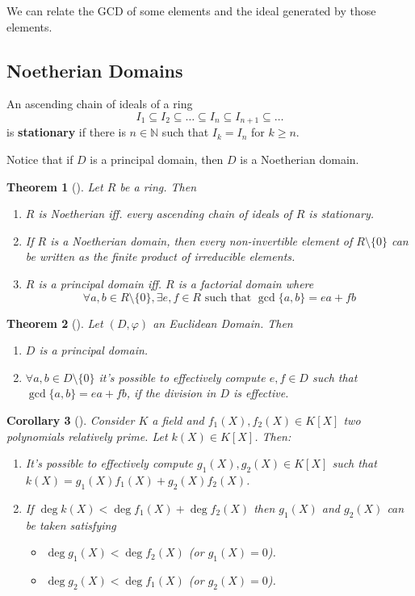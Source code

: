 \documentclass[12pt,a4paper]{article}
\newtheorem{theorem}{Theorem}[section]
\newtheorem{corollary}[theorem]{Corollary}
\theoremstyle{definition}
\begin{document}
We can relate the GCD of some elements and the ideal generated by those elements.

\subsection{Noetherian Domains}

An ascending chain of ideals of a ring
\[
I_1 \subseteq I_2 \subseteq \ldots \subseteq I_n \subseteq I_{n+1} \subseteq \ldots
\]
is \textbf{stationary} if there is $n \in \mathbb{N}$ such that $I_k = I_n$ for $k \geq n$.

Notice that if $D$ is a principal domain, then $D$ is a Noetherian domain.

\begin{theorem}[]
Let $R$ be a ring. Then
\begin{enumerate}
\item $R$ is Noetherian iff. every ascending chain of ideals of $R$ is stationary.
\item If $R$ is a Noetherian domain, then every non-invertible element of $R \setminus \{0 \}$ can be written as the finite product of irreducible elements.
\item $R$ is a principal domain iff. $R$ is a factorial domain where 
\[
\forall a, b \in R \setminus \{ 0 \}, \exists e,f \in R \text{ such that } \gcd \{ a,b\} = ea+fb
\]
\end{enumerate}
\end{theorem} 

\begin{theorem}[]
Let $(D, \varphi)$ an Euclidean Domain. Then
\begin{enumerate}
\item $D$ is a principal domain.
\item $\forall a,b \in D \setminus \{ 0 \}$ it's possible to effectively compute $e, f \in D$ such that $\gcd \{ a,b \}  = ea+fb$, if the division in $D$ is effective.
\end{enumerate}
\end{theorem}

\begin{corollary}[]
Consider $K$ a field and $f_1(X), f_2(X) \in K[X]$ two polynomials relatively prime. Let $k(X)\in K[X]$. Then:
\begin{enumerate}
\item It's possible to effectively compute $g_1(X), g_2(X) \in K[X]$ such that $k(X) = g_1(X)f_1(X)+g_2(X)f_2(X)$.
\item If $\deg k(X) < \deg f_1(X) + \deg f_2(X)$ then $g_1(X)$ and $g_2(X)$ can be taken satisfying
\begin{itemize}
\item $\deg g_1(X) < \deg f_2(X)$ (or $g_1(X) = 0$).
\item $\deg g_2(X) < \deg f_1(X)$ (or $g_2(X) = 0$).
\end{itemize}
\end{enumerate}
\end{corollary}
\end{document}
